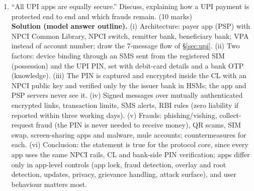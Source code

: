 \begin{enumerate}[leftmargin=1.6em,itemsep=4pt]
  \item ``All UPI apps are equally secure.'' Discuss, explaining how a UPI payment is protected end to end and which frauds remain. \hfill(10 marks)\\
  \textbf{Solution (model answer outline).} (i) Architecture: payer app (PSP) with NPCI Common Library, NPCI switch, remitter bank, beneficiary bank; VPA instead of account number; draw the 7-message flow of \S\ref{sec:upi}. (ii) Two factors: device binding through an SMS sent from the registered SIM (possession) and the UPI PIN, set with debit-card details and a bank OTP (knowledge). (iii) The PIN is captured and encrypted inside the CL with an NPCI public key and verified only by the issuer bank in HSMs; the app and PSP servers never see it. (iv) Signed messages over mutually authenticated encrypted links, transaction limits, SMS alerts, RBI rules (zero liability if reported within three working days). (v) Frauds: phishing/vishing, collect-request fraud (the PIN is never needed to receive money), QR scams, SIM swap, screen-sharing apps and malware, mule accounts; countermeasures for each. (vi) Conclusion: the statement is true for the protocol core, since every app uses the same NPCI rails, CL and bank-side PIN verification; apps differ only in app-level controls (app lock, fraud detection, overlay and root detection, updates, privacy, grievance handling, attack surface), and user behaviour matters most.
\end{enumerate}
